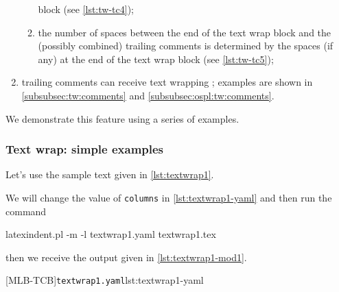 \begin{enumerate}
\begin{enumerate}
               block (see \cref{lst:tw-tc4});
         \item the number of spaces between the end of the text wrap block and the
               (possibly combined) trailing comments is determined by the spaces (if any)
               at the end of the text wrap block (see \cref{lst:tw-tc5});
        \end{enumerate}
  \item trailing comments can receive text wrapping ; examples are shown in \cref{subsubsec:tw:comments} and
        \cref{subsubsec:ospl:tw:comments}.
 \end{enumerate}

 We demonstrate this feature using a series of examples.

\subsubsection{Text wrap: simple examples}\label{subsec:textwrapping-quick-start}

 \begin{example}
 Let's use the sample text given in \cref{lst:textwrap1}. 


 We will change the value of \texttt{columns} in \cref{lst:textwrap1-yaml} and then run
 the command

 \begin{commandshell}
latexindent.pl -m -l textwrap1.yaml textwrap1.tex
\end{commandshell}

 then we receive the output given in \cref{lst:textwrap1-mod1}.

 \begin{cmhtcbraster}[raster column skip=.1\linewidth]
  [MLB-TCB]{\texttt{textwrap1.yaml}}{lst:textwrap1-yaml}
 \end{cmhtcbraster}
 \end{example}

